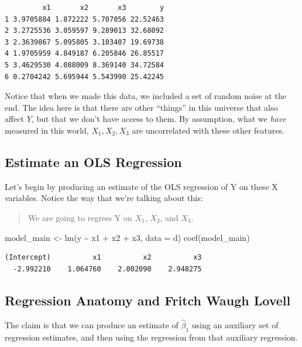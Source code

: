 \documentclass[
  letterpaper,
  DIV=11,
  numbers=noendperiod]{scrreprt}
\newenvironment{Shaded}{\begin{snugshade}}{\end{snugshade}}
\newcommand{\AttributeTok}[1]{\textcolor[rgb]{0.40,0.45,0.13}{#1}}
\newcommand{\FunctionTok}[1]{\textcolor[rgb]{0.28,0.35,0.67}{#1}}
\newcommand{\NormalTok}[1]{\textcolor[rgb]{0.00,0.23,0.31}{#1}}
\newcommand{\OtherTok}[1]{\textcolor[rgb]{0.00,0.23,0.31}{#1}}
\newcommand{\SpecialCharTok}[1]{\textcolor[rgb]{0.37,0.37,0.37}{#1}}
\begin{document}
\begin{verbatim}
         x1       x2       x3        y
1 3.9705884 1.872222 5.707056 22.52463
2 3.2725536 3.059597 9.289013 32.68092
3 2.3639867 5.095805 3.103407 19.69738
4 1.9705959 4.849187 6.205846 26.85517
5 3.4629530 4.088009 8.369140 34.72584
6 0.2704242 5.695944 5.543990 25.42245
\end{verbatim}

Notice that when we made this data, we included a set of random noise at
the end. The idea here is that there are other ``things'' in this
universe that also affect \(Y\), but that we don't have access to them.
By assumption, what we \emph{have} measured in this world,
\(X_1, X_2, X_3\) are uncorrelated with these other features.

\subsection{Estimate an OLS
Regression}\label{estimate-an-ols-regression}

Let's begin by producing an estimate of the OLS regression of Y on these
X variables. Notice the way that we're talking about this:

\begin{quote}
We are going to regress Y on \(X_{1}\), \(X_{2}\), and \(X_{3}\).
\end{quote}

\begin{Shaded}
\begin{Highlighting}[]
\NormalTok{model\_main }\OtherTok{\textless{}{-}} \FunctionTok{lm}\NormalTok{(y }\SpecialCharTok{\textasciitilde{}}\NormalTok{ x1 }\SpecialCharTok{+}\NormalTok{ x2 }\SpecialCharTok{+}\NormalTok{ x3, }\AttributeTok{data =}\NormalTok{ d)}
\FunctionTok{coef}\NormalTok{(model\_main)}
\end{Highlighting}
\end{Shaded}

\begin{verbatim}
(Intercept)          x1          x2          x3 
  -2.992210    1.064760    2.002090    2.948275 
\end{verbatim}

\subsection{Regression Anatomy and Fritch Waugh
Lovell}\label{regression-anatomy-and-fritch-waugh-lovell}

The claim is that we can produce an estimate of \(\hat{\beta}_1\) using
an auxiliary set of regression estimates, and then using the regression
from that auxiliary regression.
\end{document}
